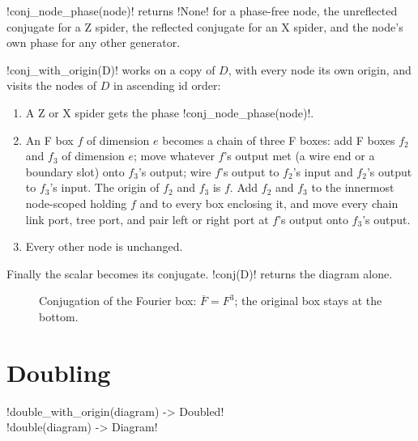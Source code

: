 \py!conj_node_phase(node)! returns \py!None! for a phase-free node, the unreflected conjugate for a Z spider, the reflected conjugate for an X spider, and the node's own phase for any other generator.

\begin{algorithm}\label{alg:mixed-conj}
\py!conj_with_origin(D)! works on a copy of $D$, with every node its own origin, and visits the nodes of $D$ in ascending id order:
\begin{enumerate}
\item A Z or X spider gets the phase \py!conj_node_phase(node)!.
\item An F box $f$ of dimension $e$ becomes a chain of three F boxes: add F boxes $f_2$ and $f_3$ of dimension $e$; move whatever $f$'s output met (a wire end or a boundary slot) onto $f_3$'s output; wire $f$'s output to $f_2$'s input and $f_2$'s output to $f_3$'s input. The origin of $f_2$ and $f_3$ is $f$. Add $f_2$ and $f_3$ to the innermost node-scoped \bbox{} holding $f$ and to every box enclosing it, and move every chain link port, tree port, and pair left or right port at $f$'s output onto $f_3$'s output.
\item Every other node is unchanged.
\end{enumerate}
Finally the scalar becomes its conjugate. \py!conj(D)! returns the diagram alone.
\end{algorithm}

\begin{figure}[H]
\centering
{}
\caption{Conjugation of the Fourier box: $\overline F=F^3$; the original box stays at the bottom.}
\label{fig:mixed-conj-f}
\end{figure}

\section{Doubling}\label{sec:mixed-double}

\begin{signature}
\py!double_with_origin(diagram) -> Doubled!\\
\py!double(diagram) -> Diagram!
\end{signature}

